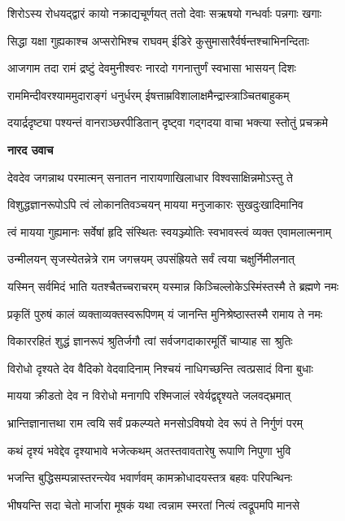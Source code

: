 \twolineshloka
{शिरोऽस्य रोधयद्द्वारं कायो नक्राद्यचूर्णयत्}
{ततो देवाः सऋषयो गन्धर्वाः पन्नगाः खगाः} %

\twolineshloka
{सिद्धा यक्षा गुह्यकाश्च अप्सरोभिश्च राघवम्}
{ईडिरे कुसुमासारैर्वर्षन्तश्चाभिनन्दिताः} %

\twolineshloka
{आजगाम तदा रामं द्रष्टुं देवमुनीश्वरः}
{नारदो गगनात्तुर्णं स्वभासा भासयन् दिशः} %

\twolineshloka
{राममिन्दीवरश्याममुदाराङ्गं धनुर्धरम्}
{ईषत्ताम्रविशालाक्षमैन्द्रास्त्राञ्चितबाहुकम्} %

\twolineshloka
{दयार्द्रदृष्ट्या पश्यन्तं वानराञ्छरपीडितान्}
{दृष्ट्वा गद्गदया वाचा भक्त्या स्तोतुं प्रचक्रमे} %

\textbf{नारद उवाच}

\twolineshloka
{देवदेव जगन्नाथ परमात्मन् सनातन}
{नारायणाखिलाधार विश्वसाक्षिन्नमोऽस्तु ते} %

\twolineshloka
{विशुद्धज्ञानरूपोऽपि त्वं लोकानतिवञ्चयन्}
{मायया मनुजाकारः सुखदुःखादिमानिव} %

\twolineshloka
{त्वं मायया गुह्यमानः सर्वेषां हृदि संस्थितः}
{स्वयञ्ज्योतिः स्वभावस्त्वं व्यक्त एवामलात्मनाम्} %

\twolineshloka
{उन्मीलयन् सृजस्येतन्नेत्रे राम जगत्त्रयम्}
{उपसंह्रियते सर्वं त्वया चक्षुर्निमीलनात्} %

\twolineshloka
{यस्मिन् सर्वमिदं भाति यतश्चैतच्चराचरम्}
{यस्मान्न किञ्चिल्लोकेऽस्मिंस्तस्मै ते ब्रह्मणे नमः} %

\twolineshloka
{प्रकृतिं पुरुषं कालं व्यक्ताव्यक्तस्वरूपिणम्}
{यं जानन्ति मुनिश्रेष्ठास्तस्मै रामाय ते नमः} %

\twolineshloka
{विकाररहितं शुद्धं ज्ञानरूपं श्रुतिर्जगौ}
{त्वां सर्वजगदाकारमूर्तिं चाप्याह सा श्रुतिः} %

\twolineshloka
{विरोधो दृश्यते देव वैदिको वेदवादिनाम्}
{निश्चयं नाधिगच्छन्ति त्वत्प्रसादं विना बुधाः} %

\twolineshloka
{मायया क्रीडतो देव न विरोधो मनागपि}
{रश्मिजालं रवेर्यद्वद्दृश्यते जलवद्\mbox{}भ्रमात्} %

\twolineshloka
{भ्रान्तिज्ञानात्तथा राम त्वयि सर्वं प्रकल्प्यते}
{मनसोऽविषयो देव रूपं ते निर्गुणं परम्} %

\twolineshloka
{कथं दृश्यं भवेद्देव दृश्याभावे भजेत्कथम्}
{अतस्तवावतारेषु रूपाणि निपुणा भुवि} %

\twolineshloka
{भजन्ति बुद्धिसम्पन्नास्तरन्त्येव भवार्णवम्}
{कामक्रोधादयस्तत्र बहवः परिपन्थिनः} %

\twolineshloka
{भीषयन्ति सदा चेतो मार्जारा मूषकं यथा}
{त्वन्नाम स्मरतां नित्यं त्वद्रूपमपि मानसे} %


